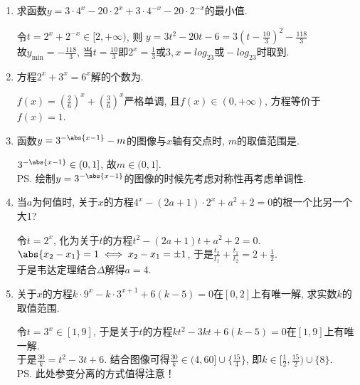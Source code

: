 \begin{enumerate}
\begin{jieda}
\begin{enumerate}
    \item $f(x)$必然是单调函数，因此只需其两个端点满足要求即可保证恒成立，即$f(1) > 1, f(2) > 1$, 解得$a\in(-\infty,-5)\cup(1,+\infty)$. 
    \end{enumerate}
    \end{jieda}
    \item 求函数$y=3\cdot4^x-20\cdot2^x+3\cdot4^{-x}-20\cdot2^{-x}$的最小值. 
    \begin{jieda}
    令$t=2^x+2^{-x}\in[2,+\infty)$, 则
    $y = 3t^2-20t-6 = 3(t-\frac{10}{3})^2-\frac{118}{3}$ \\
    故$y_{\min}=-\frac{118}{3}$, 当$t=\frac{10}{3}$即$2^x = \frac{1}{3}\mbox{或}3, x=log_23 \mbox{或}-log_23$时取到. 
    \end{jieda}
    \item 方程$2^x+3^x=6^x$解的个数为. 
    \begin{jieda}
    $f(x)=(\frac{2}{6})^x+(\frac{3}{6})^x$严格单调, 且$f(x)\in(0,+\infty)$, 方程等价于$f(x)=1$. 
    \end{jieda}
    \item 函数$y=3^{-\abs{x-1}}-m$的图像与$x$轴有交点时, $m$的取值范围是\blkda{$(0,1]$}. 
    \begin{jieda}
    $3^{-\abs{x-1}}\in(0,1]$, 故$m\in(0,1]$. \\
    \ps 绘制$y=3^{-\abs{x-1}}$的图像的时候先考虑对称性再考虑单调性.
    \end{jieda}
    \item 当$a$为何值时, 关于$x$的方程$4^{x}-(2a+1)\cdot 2^{x}+a^2+2=0$的根一个比另一个大1? 
    \begin{jieda}
    令$t=2^x$, 化为关于$t$的方程$t^2-(2a+1)t+a^2+2=0$. \\
    $\abs{x_2-x_1}=1\iff x_2-x_1=\pm1$, 于是$\frac{t_2}{t_1}+\frac{t_1}{t_2}=2+\frac{1}{2}$. \\
    于是韦达定理结合$\Delta$解得$a=4$. 
    \end{jieda}
    
    \item 关于$x$的方程$k\cdot9^x-k\cdot3^{x+1}+6(k-5)=0$在$[0,2]$上有唯一解, 求实数$k$的取值范围. 
    \begin{jieda}
    令$t=3^x\in[1,9]$, 于是关于$t$的方程$kt^2-3kt+6(k-5)=0$在$[1,9]$上有唯一解. \\
    于是$\frac{30}{k}=t^2-3t+6$. 结合图像可得$\frac{30}{k}\in(4,60]\cup\{\frac{15}{4}\}$, 即$k\in[\frac{1}{2},\frac{15}{2})\cup\{8\}$. \\
    \ps 此处参变分离的方式值得注意！
    \end{jieda}
    

\end{enumerate}
